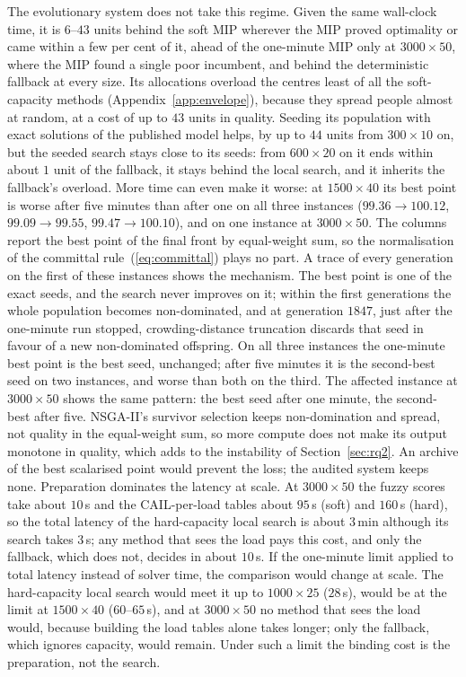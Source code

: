 \documentclass[systems,article,submit,moreauthors,pdftex]{Definitions/mdpi}
\begin{document}
The evolutionary system does not take this regime. Given the same wall-clock time, it is
$6$--$43$ units behind the soft MIP wherever the MIP proved optimality or came within a few
per cent of it, ahead of the one-minute MIP only at $3000\times50$, where the MIP found a single
poor incumbent, and behind the deterministic fallback at every size. Its allocations overload the
centres least of all the soft-capacity methods (Appendix~\ref{app:envelope}), because they spread
people almost at random, at a cost of up to $43$ units in quality. Seeding its population with exact solutions of the
published model helps, by up to $44$ units from $300\times10$ on, but the seeded search stays
close to its seeds: from $600\times20$ on it ends within about $1$ unit of the fallback, it stays
behind the local search, and it inherits the fallback's overload. More time can even make it
worse: at $1500\times40$ its best point is worse after five minutes than after one on all three
instances ($99.36 \to 100.12$, $99.09 \to 99.55$, $99.47 \to 100.10$), and on one instance at
$3000\times50$. The columns report the best point of the final front by equal-weight sum, so the
normalisation of the committal rule~(\ref{eq:committal}) plays no part. A trace of every generation on
the first of these instances shows the mechanism. The best point is one of the exact seeds, and
the search never improves on it; within the first generations the whole population becomes non-dominated,
and at generation $1847$, just after the one-minute run stopped, crowding-distance truncation
discards that seed in favour of a new non-dominated offspring. On all three instances the
one-minute best point is the best seed, unchanged; after five minutes it is the second-best seed
on two instances, and worse than both on the third. The affected instance at $3000\times50$ shows
the same pattern: the best seed after one minute, the second-best after five. NSGA-II's survivor selection keeps non-domination and spread, not quality
in the equal-weight sum, so more compute does not make its output monotone in quality, which adds to
the instability of Section~\ref{sec:rq2}. An archive of the best scalarised point would prevent
the loss; the audited system keeps none. Preparation dominates the
latency at scale. At $3000\times50$ the fuzzy scores take about $10$\,s and the CAIL-per-load
tables about $95$\,s (soft) and $160$\,s (hard), so the total latency of the hard-capacity local
search is about $3$\,min although its search takes $3$\,s; any method that sees the load pays this
cost, and only the fallback, which does not, decides in about $10$\,s. If the one-minute limit
applied to total latency instead of solver time, the comparison would change at scale. The
hard-capacity local search would meet it up to $1000\times25$ ($28$\,s), would be at the limit at
$1500\times40$ ($60$--$65$\,s), and at $3000\times50$ no method that sees the load would, because building the load
tables alone takes longer; only the fallback, which ignores capacity, would remain. Under such a
limit the binding cost is the preparation, not the search.
\end{document}
